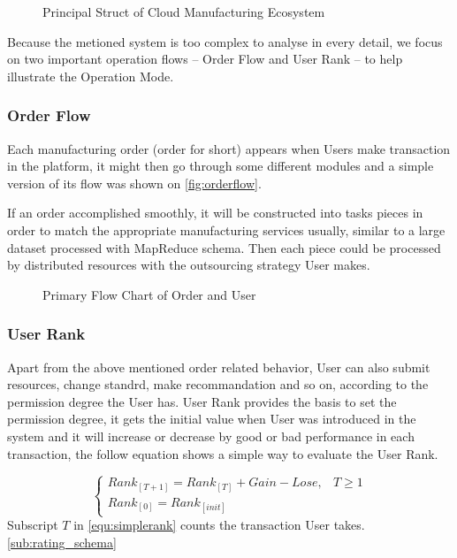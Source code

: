 \begin{figure}[!h]
\centering
\resizebox{0.7\textwidth}{!}{}
\caption{Principal Struct of Cloud Manufacturing Ecosystem}
\label{fig:platformstruct}
\end{figure}

Because the metioned system is too complex to analyse in every detail, we focus on two important operation flows -- Order Flow and User Rank -- to help illustrate the Operation Mode. 

\subsubsection{Order Flow}
Each manufacturing order (order for short) appears when Users make transaction in the platform, it might then go through some different modules and a simple version of its flow was shown on \autoref{fig:orderflow}.

If an order accomplished smoothly, it will be constructed into tasks pieces in order to match the appropriate manufacturing services usually, similar to a large dataset processed with MapReduce\cite{Dean2008} schema. Then each piece could be processed by distributed resources with the outsourcing strategy User makes.

\begin{figure}[!h]
\centering\small
{} \hspace{0.09\textwidth}
\caption{ Primary Flow Chart of Order and User}
\end{figure}
\subsubsection{User Rank}
Apart from the above mentioned order related behavior, User can also submit resources, change standrd, make recommandation and so on, according to the permission degree the User has. User Rank provides the basis to set the permission degree, it gets the initial value when User was introduced in the system and it will increase or decrease by good or bad performance in each transaction, the follow equation shows a simple way to evaluate the User Rank. 

\begin{equation}
  \begin{cases}
      Rank_{[T+1]} = Rank_{[T]} + Gain - Lose, & T \geqslant 1\\
      Rank_{[0]} = Rank_{[init]}
  \end{cases}
\label{equ:simplerank}
\end{equation}
Subscript $T$ in \eqref{equ:simplerank} counts the transaction User takes. \autoref{sub:rating_schema}

